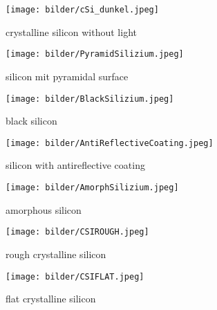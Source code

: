 \begin{figure}[h]
	\centering
	\texttt{[image: bilder/cSi\_dunkel.jpeg]}
	\caption{crystalline silicon without light}
	\label{fig:csi_dunkel}
\end{figure}

\begin{figure}[h]
	\centering
	\texttt{[image: bilder/PyramidSilizium.jpeg]}
	\caption{silicon mit pyramidal surface}
	\label{fig:pyramidsilizium}
\end{figure}

\begin{figure}[h]
	\centering
	\texttt{[image: bilder/BlackSilizium.jpeg]}
	\caption{black silicon}
	\label{fig:blacksilizium}
\end{figure}

\begin{figure}[h]
	\centering
	\texttt{[image: bilder/AntiReflectiveCoating.jpeg]}
	\caption{silicon with antireflective coating}
	\label{fig:antireflectivecoating}
\end{figure}

\begin{figure}[h]
	\centering
	\texttt{[image: bilder/AmorphSilizium.jpeg]}
	\caption{amorphous silicon}
	\label{fig:amorphsilizium}
\end{figure}

\begin{figure}[h]
	\centering
	\texttt{[image: bilder/CSIROUGH.jpeg]}
	\caption{rough crystalline silicon}
	\label{fig:csirough}
\end{figure}

\begin{figure}[h]
	\centering
	\texttt{[image: bilder/CSIFLAT.jpeg]}
	\caption{flat crystalline silicon}
	\label{fig:csiflat}
\end{figure}






